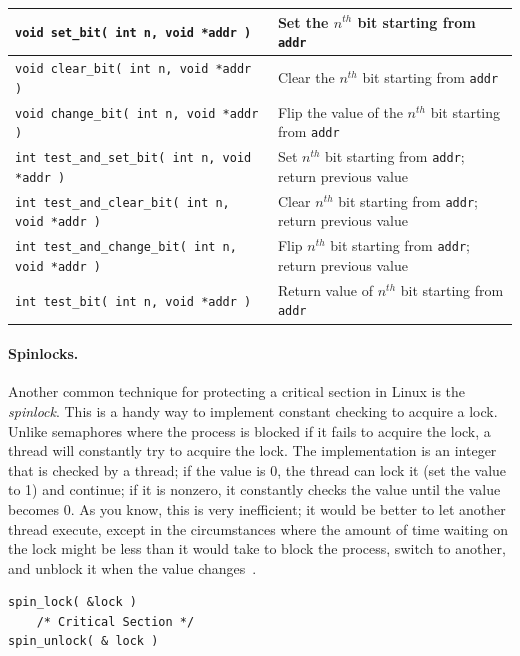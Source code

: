\begin{center}
\begin{tabular}{l|l}
\texttt{void set\_bit( int n, void *addr )} &  Set the $n^{th}$ bit starting from \texttt{addr}\\\hline

\texttt{void clear\_bit( int n, void *addr )} &  Clear the $n^{th}$ bit starting from \texttt{addr}\\\hline

\texttt{void change\_bit( int n, void *addr )} &  Flip the value of the $n^{th}$ bit starting from \texttt{addr}\\\hline

\texttt{int test\_and\_set\_bit( int n, void *addr )} &  Set $n^{th}$ bit starting from \texttt{addr}; return previous value\\\hline

\texttt{int test\_and\_clear\_bit( int n, void *addr )} &  Clear $n^{th}$ bit starting from \texttt{addr}; return previous value\\\hline

\texttt{int test\_and\_change\_bit( int n, void *addr )} &  Flip $n^{th}$ bit starting from \texttt{addr}; return previous value\\\hline

\texttt{int test\_bit( int n, void *addr )} &  Return value of $n^{th}$ bit starting from \texttt{addr}\\\hline

\end{tabular}
\end{center}

\paragraph{Spinlocks.}
Another common technique for protecting a critical section in Linux is the \textit{spinlock}. This is a handy way to implement constant checking to acquire a lock. Unlike semaphores where the process is blocked if it fails to acquire the lock, a thread will constantly try to acquire the lock. The implementation is an integer that is checked by a thread; if the value is 0, the thread can lock it (set the value to 1) and continue; if it is nonzero, it constantly checks the value until the value becomes 0. As you know, this is very inefficient; it would be better to let another thread execute, except in the circumstances where the amount of time waiting on the lock might be less than it would take to block the process, switch to another, and unblock it when the value changes~\cite{osi}.

\begin{verbatim}
spin_lock( &lock )
    /* Critical Section */
spin_unlock( & lock )
\end{verbatim}

